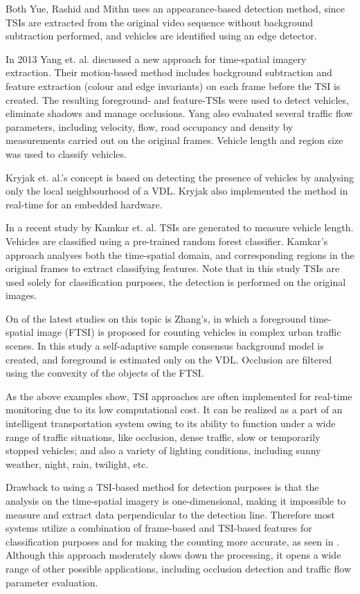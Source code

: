 Both Yue, Rashid and Mithn uses an appearance-based detection method, since TSIs are extracted from the original video sequence without background subtraction performed, and vehicles are identified using an edge detector.

In 2013 Yang et. al. discussed a new approach for time-spatial imagery extraction\cite{Yang2013a}.
Their motion-based method includes background subtraction and feature extraction (colour and edge invariants) on each frame before the TSI is created.
The resulting foreground- and feature-TSIs were used to detect vehicles, eliminate shadows and manage occlusions.
Yang also evaluated several traffic flow parameters, including velocity, flow, road occupancy and density by measurements carried out on the original frames. 
Vehicle length and region size was used to classify vehicles.

Kryjak et. al.'s concept is based on detecting the presence of vehicles by analysing only the local neighbourhood of a VDL.
Kryjak also implemented the method in real-time for an embedded hardware\cite{Kryjak2014}.

In a recent study by Kamkar et. al. TSIs are generated to measure vehicle length. Vehicles are classified using a pre-trained random forest classifier\cite{Kamkar2016}. 
Kamkar's approach analyses both the time-spatial domain, and corresponding regions in the original frames to extract classifying features.
Note that in this study TSIs are used solely for classification purposes, the detection is performed on the original images.

On of the latest studies on this topic is Zhang's, in which a foreground time-spatial image (FTSI) is proposed for counting vehicles in complex urban traffic scenes\cite{Zhang2016}.
In this study a self-adaptive sample consensus background model is created, and foreground is estimated only on the VDL.
Occlusion are filtered using the convexity of the objects of the FTSI.

As the above examples show, TSI approaches are often implemented for real-time monitoring due to its low computational cost.
It can be realized as a part of an intelligent transportation system owing to its ability to function under a wide range of traffic situations, like occlusion, dense traffic, slow or temporarily stopped vehicles; and also a variety of lighting conditions, including sunny weather, night, rain, twilight, etc.

Drawback to using a TSI-based method for detection purposes is that the analysis on the time-spatial imagery is one-dimensional, making it impossible to measure and extract data perpendicular to the detection line.
Therefore most systems utilize a combination of frame-based and TSI-based features for classification purposes and for making the counting more accurate, as seen in \cite{Kryjak2014, Yang2013a}. 
Although this approach moderately slows down the processing, it opens a wide range of other possible applications, including occlusion detection and traffic flow parameter evaluation.

